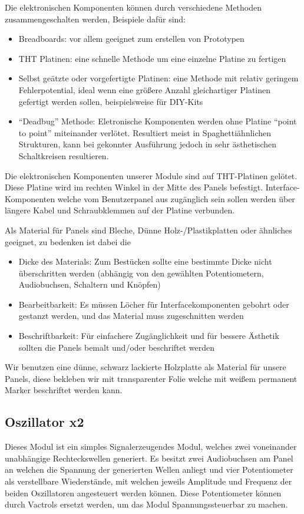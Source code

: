 Die elektronischen Komponenten können durch verschiedene Methoden zusammengeschalten werden, Beispiele dafür sind:
\begin{itemize}
\item Breadboards:
vor allem geeignet zum erstellen von Prototypen
\item THT Platinen:
eine schnelle Methode um eine einzelne Platine zu fertigen
\item Selbst geätzte oder vorgefertigte Platinen:
eine Methode mit relativ geringem Fehlerpotential, ideal wenn eine größere Anzahl gleichartiger Platinen gefertigt werden sollen, beispielsweise für DIY-Kits
\item "`Deadbug"' Methode:
Eletronische Komponenten werden ohne Platine "`point to point"' miteinander verlötet. Resultiert meist in Spaghettiähnlichen Strukturen, kann bei gekonnter Ausführung jedoch in sehr ästhetischen Schaltkreisen resultieren.
\end{itemize}

Die elektronischen Komponenten unserer Module sind auf THT-Platinen gelötet. Diese Platine wird im rechten Winkel in der Mitte des Panels befestigt. Interface-Komponenten welche vom Benutzerpanel aus zugänglich sein sollen werden über längere Kabel und Schraubklemmen auf der Platine verbunden.

Als Material für Panels sind Bleche, Dünne Holz-/Plastikplatten oder ähnliches geeignet, zu bedenken ist dabei die 

\begin{itemize}
\item Dicke des Materials:
Zum Bestücken sollte eine bestimmte Dicke nicht überschritten werden (abhängig von den gewählten Potentiometern, Audiobuchsen, Schaltern und Knöpfen)
\item Bearbeitbarkeit:
Es müssen Löcher für Interfacekomponenten gebohrt oder gestanzt werden, und das Material muss zugeschnitten werden
\item Beschriftbarkeit:
Für einfachere Zugänglichkeit und für bessere Ästhetik sollten die Panels bemalt und/oder beschriftet werden
\end{itemize}

Wir benutzen eine dünne, schwarz lackierte Holzplatte als Material für unsere Panels, diese bekleben wir mit transparenter Folie welche mit weißem permanent Marker beschriftet werden kann.

\subsection{Oszillator x2}
\label{sec:org2b19020}
Dieses Modul ist ein simples Signalerzeugendes Modul, welches zwei voneinander unabhängige Rechteckswellen generiert. Es besitzt zwei Audiobuchsen am Panel an welchen die Spannung der generierten Wellen anliegt und vier Potentiometer als verstellbare Wiederstände, mit welchen jeweils Amplitude und Frequenz der beiden Oszillatoren angesteuert werden können. Diese Potentiometer können durch Vactrols ersetzt werden, um das Modul Spannungssteuerbar zu machen.

